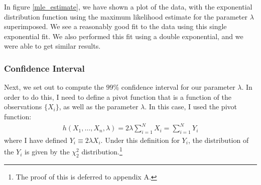 In figure \ref{mle_estimate}, we have shown a plot of the data, with the exponential distribution function using the maximum likelihood estimate for the parameter $\lambda$ superimposed. We see a reasonably good fit to the data using this single exponential fit. We also performed this fit using a double exponential, and we were able to get similar results. 

\subsubsection*{Confidence Interval}
Next, we set out to compute the $99$\% confidence interval for our parameter $\lambda$. In order to do this, I need to define a pivot function that is a function of the observations $\{X_i\}$, as well as the parameter $\lambda$. In this case, I used the pivot function:
\begin{align}
        h(X_1,\ldots,X_n, \lambda)=2\lambda \sum_{i=1}^NX_i=\sum_{i=1}^NY_i
\end{align}
where I have defined $Y_i\equiv 2\lambda X_i$. Under this definition for $Y_i$, the distribution of the $Y_i$ is given by the $\chi_2^2$ distribution.\footnote{The proof of this is deferred to appendix A.}

